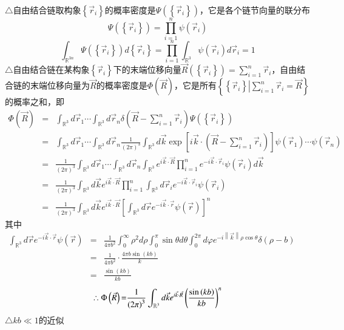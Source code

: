 \documentclass{article} %
\begin{document}
\noindent $\mathrm{\triangle}$自由结合链取构象$\left\{\vec{r}_{i} \right\}$的概率密度是$\Psi \left(\left\{\vec{r}_{i} \right\}\right)$，它是各个链节向量的联分布
\[\Psi \left(\left\{\vec{r}_{i} \right\}\right)=\prod _{i=1}^{n}\psi \left(\vec{r}_{i} \right) \] 
\[\int _{{\mathbb R}^{3n} }\Psi \left(\left\{\vec{r}_{i} \right\}\right) d\left\{\vec{r}_{i} \right\}=\prod _{i=1}^{n}\int _{{\mathbb R}^{3} }\psi \left(\vec{r}_{i} \right)d  \vec{r}_{i} =1\] 
$\mathrm{\triangle}$自由结合链在某构象$\left\{\vec{r}_{i} \right\}$下的末端位移向量$\vec{R}\left(\left\{\vec{r}_{i} \right\}\right)=\sum _{i=1}^{n}\vec{r}_{i}  $，自由结合链的末端位移向量为$\vec{R}$的概率密度是$\Phi \left(\vec{R}\right)$，它是所有$\left\{\left. \left\{\vec{r}_{i} \right\}\right|\sum _{i=1}^{n}\vec{r}_{i}  =\vec{R}\right\}$的概率之和，即
\[\begin{array}{rcl} {\Phi \left(\vec{R}\right)} & {=} & {\int _{{\mathbb R}^{3} }d\vec{r}_{1}  \cdots \int _{{\mathbb R}^{3} }d\vec{r}_{n}  \delta \left(\vec{R}-\sum _{i=1}^{n}\vec{r}_{i}  \right)\Psi \left(\left\{\vec{r}_{i} \right\}\right)} \\ {} & {=} & {\int _{{\mathbb R}^{3} }d\vec{r}_{1}  \cdots \int _{{\mathbb R}^{3} }d\vec{r}_{n}  \frac{1}{\left(2\pi \right)^{3} } \int _{{\mathbb R}^{3} }d\vec{k} \exp \left[i\vec{k}\cdot \left(\vec{R}-\sum _{i=1}^{n}\vec{r}_{i}  \right)\right]\psi \left(\vec{r}_{1} \right)\cdots \psi \left(\vec{r}_{n} \right)} \\ {} & {=} & {\frac{1}{\left(2\pi \right)^{3} } \int _{{\mathbb R}^{3} }d\vec{r}_{1}  \cdots \int _{{\mathbb R}^{3} }d\vec{r}_{n}  \int _{{\mathbb R}^{3} }e^{i\vec{k}\cdot \vec{R}} \prod _{i=1}^{n}e^{-i\vec{k}\cdot \vec{r}_{i} } \psi \left(\vec{r}_{i} \right) d\vec{k} } \\ {} & {=} & {\frac{1}{\left(2\pi \right)^{3} } \int _{{\mathbb R}^{3} }d\vec{k} e^{i\vec{k}\cdot \vec{R}} \prod _{i=1}^{n}\int _{{\mathbb R}^{3} }d\vec{r}_{i}   e^{-i\vec{k}\cdot \vec{r}_{i} } \psi \left(\vec{r}_{i} \right)} \\ {} & {=} & {\frac{1}{\left(2\pi \right)^{3} } \int _{{\mathbb R}^{3} }d\vec{k} e^{i\vec{k}\cdot \vec{R}} \left[\int _{{\mathbb R}^{3} }d\vec{r} e^{-i\vec{k}\cdot \vec{r}} \psi \left(\vec{r}\right)\right]^{n} } \end{array}\] 
其中$\begin{array}{rcl} {\int _{{\mathbb R}^{3} }d\vec{r} e^{-i\vec{k}\cdot \vec{r}} \psi \left(\vec{r}\right)} & {=} & {\frac{1}{4\pi b^{2} } \int _{0}^{\infty }\rho ^{2}  d\rho \int _{0}^{\pi }\sin \theta  d\theta \int _{0}^{2\pi }d\varphi e^{-i\left\| \vec{k}\right\| \rho \cos \theta } \delta \left(\rho -b\right) } \\ {} & {=} & {\frac{1}{4\pi b^{2} } \cdot \frac{4\pi b\sin \left(kb\right)}{k} } \\ {} & {=} & {\frac{\sin \left(kb\right)}{kb} } \end{array}$ 
\[\therefore \Phi \left(\vec{R}\right){\rm =}\frac{{\rm 1}}{\left({\rm 2}\pi \right)^{{\rm 3}} } \int _{{\mathbb R}^{3} }d\vec{k} e^{i\vec{k}\cdot \vec{R}} \left(\frac{\sin \left(kb\right)}{kb} \right)^{n} \] 
$\mathrm{\triangle}$$kb\ll 1$的近似
\end{document}
